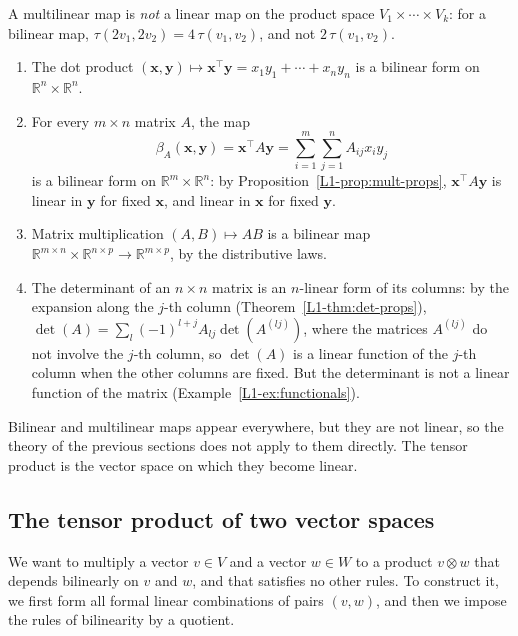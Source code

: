 A multilinear map is \emph{not} a linear map on the product space $V_1 \times \cdots \times V_k$: for a bilinear map, $\tau(2v_1, 2v_2) = 4\,\tau(v_1, v_2)$, and not $2\,\tau(v_1, v_2)$.

\begin{example}\label{L1-ex:multilinear}
    \begin{enumerate}
        \item The dot product $(\mathbf{x}, \mathbf{y}) \mapsto \mathbf{x}^\top \mathbf{y} = x_1y_1 + \cdots + x_ny_n$ is a bilinear form on $\mathbb{R}^n \times \mathbb{R}^n$.
        \item For every $m \times n$ matrix $A$, the map
        \[\beta_A(\mathbf{x}, \mathbf{y}) = \mathbf{x}^\top A \mathbf{y} = \sum_{i=1}^m \sum_{j=1}^n A_{ij}x_iy_j\]
        is a bilinear form on $\mathbb{R}^m \times \mathbb{R}^n$: by Proposition~\ref{L1-prop:mult-props}, $\mathbf{x}^\top A\mathbf{y}$ is linear in $\mathbf{y}$ for fixed $\mathbf{x}$, and linear in $\mathbf{x}$ for fixed $\mathbf{y}$.
        \item Matrix multiplication $(A, B) \mapsto AB$ is a bilinear map $\mathbb{R}^{m \times n} \times \mathbb{R}^{n \times p} \to \mathbb{R}^{m \times p}$, by the distributive laws.
        \item The determinant of an $n \times n$ matrix is an $n$-linear form of its columns: by the expansion along the $j$-th column (Theorem~\ref{L1-thm:det-props}), $\det(A) = \sum_l (-1)^{l+j} A_{lj}\det(A^{(lj)})$, where the matrices $A^{(lj)}$ do not involve the $j$-th column, so $\det(A)$ is a linear function of the $j$-th column when the other columns are fixed. But the determinant is not a linear function of the matrix (Example~\ref{L1-ex:functionals}).
    \end{enumerate}
\end{example}

Bilinear and multilinear maps appear everywhere, but they are not linear, so the theory of the previous sections does not apply to them directly. The tensor product is the vector space on which they become linear.

\subsection{The tensor product of two vector spaces}

We want to multiply a vector $v \in V$ and a vector $w \in W$ to a product $v \otimes w$ that depends bilinearly on $v$ and $w$, and that satisfies no other rules. To construct it, we first form all formal linear combinations of pairs $(v, w)$, and then we impose the rules of bilinearity by a quotient.

